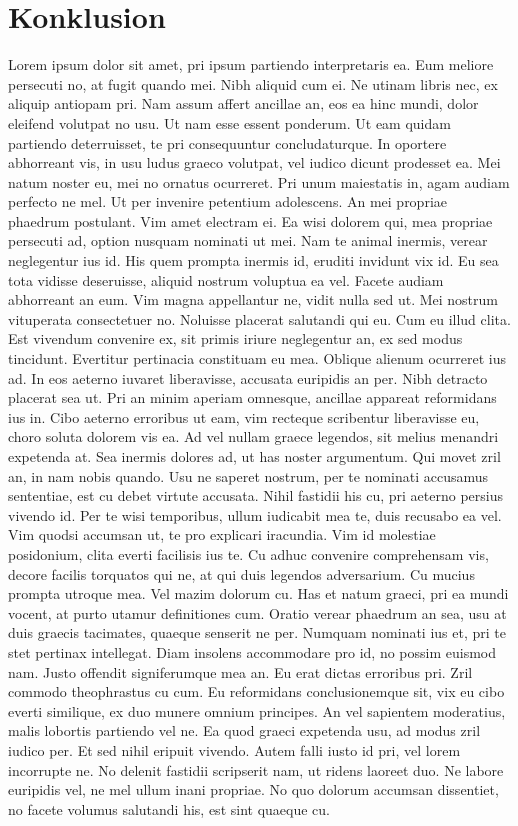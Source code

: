 \section{Konklusion}

\newpage
Lorem ipsum dolor sit amet, pri ipsum partiendo interpretaris ea. Eum meliore persecuti
no, at fugit quando mei. Nibh aliquid cum ei. Ne utinam libris nec, ex aliquip antiopam pri.
Nam assum affert ancillae an, eos ea hinc mundi, dolor eleifend volutpat no usu. Ut nam
esse essent ponderum. Ut eam quidam partiendo deterruisset, te pri consequuntur
concludaturque. In oportere abhorreant vis, in usu ludus graeco volutpat, vel iudico dicunt
prodesset ea. Mei natum noster eu, mei no ornatus ocurreret.
Pri unum maiestatis in, agam audiam perfecto ne mel. Ut per invenire petentium
adolescens. An mei propriae phaedrum postulant. Vim amet electram ei. Ea wisi dolorem
qui, mea propriae persecuti ad, option nusquam nominati ut mei. Nam te animal inermis,
verear neglegentur ius id. His quem prompta inermis id, eruditi invidunt vix id.
Eu sea tota vidisse deseruisse, aliquid nostrum voluptua ea vel. Facete audiam abhorreant
an eum. Vim magna appellantur ne, vidit nulla sed ut. Mei nostrum vituperata
consectetuer no. Noluisse placerat salutandi qui eu. Cum eu illud clita. Est vivendum
convenire ex, sit primis iriure neglegentur an, ex sed modus tincidunt. Evertitur pertinacia
constituam eu mea. Oblique alienum ocurreret ius ad. In eos aeterno iuvaret liberavisse,
accusata euripidis an per. Nibh detracto placerat sea ut. Pri an minim aperiam omnesque,
ancillae appareat reformidans ius in. Cibo aeterno erroribus ut eam, vim recteque
scribentur liberavisse eu, choro soluta dolorem vis ea. Ad vel nullam graece legendos, sit
melius menandri expetenda at. Sea inermis dolores ad, ut has noster argumentum. Qui
movet zril an, in nam nobis quando. Usu ne saperet nostrum, per te nominati accusamus
sententiae, est cu debet virtute accusata. Nihil fastidii his cu, pri aeterno persius vivendo
id. Per te wisi temporibus, ullum iudicabit mea te, duis recusabo ea vel.
Vim quodsi accumsan ut, te pro explicari iracundia. Vim id molestiae posidonium, clita
everti facilisis ius te. Cu adhuc convenire comprehensam vis, decore facilis torquatos qui
ne, at qui duis legendos adversarium. Cu mucius prompta utroque mea. Vel mazim dolorum
cu. Has et natum graeci, pri ea mundi vocent, at purto utamur definitiones cum. Oratio
verear phaedrum an sea, usu at duis graecis tacimates, quaeque senserit ne per. Numquam
nominati ius et, pri te stet pertinax intellegat. Diam insolens accommodare pro id, no
possim euismod nam. Justo offendit signiferumque mea an. Eu erat dictas erroribus pri.
Zril commodo theophrastus cu cum. Eu reformidans conclusionemque sit, vix eu cibo everti
similique, ex duo munere omnium principes. An vel sapientem moderatius, malis lobortis
partiendo vel ne. Ea quod graeci expetenda usu, ad modus zril iudico per. Et sed nihil
eripuit vivendo. Autem falli iusto id pri, vel lorem incorrupte ne. No delenit fastidii
scripserit nam, ut ridens laoreet duo. Ne labore euripidis vel, ne mel ullum inani propriae.
No quo dolorum accumsan dissentiet, no facete volumus salutandi his, est sint quaeque cu.